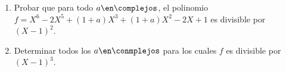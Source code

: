 \ejercicio

\begin{enumerate}[label=\roman*)] 
 \item Probar que para todo $a \en \complejos$,
   el polinomio
    $f = X^6 - 2X^5 + (1+a)X^3 + (1+a)X^2 - 2X + 1$
    es divisible por $(X-1)^2$.
  
  \item Determinar todos los $a \en \conmplejos$
    para los cuales 
    $f$ es divisible por $(X-1)^3$.
 \end{enumerate}

 \separadorCorto



